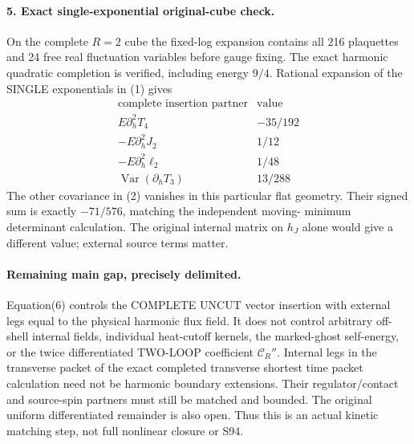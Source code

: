 \documentclass[11pt]{article}
\begin{document}
\paragraph{5. Exact single-exponential original-cube check.}
On the complete $R=2$ cube the fixed-log expansion contains all 216
plaquettes and 24 free real fluctuation variables before gauge fixing.
The exact harmonic quadratic completion is verified, including energy
$9/4$. Rational expansion of the SINGLE exponentials in (1) gives
\[
\begin{array}{c|r}
\text{complete insertion partner}&\text{value}\\\hline
E\partial_h^2T_4&-35/192\\
-E\partial_h^2J_2&1/12\\
-E\partial_h^2\ell_2&1/48\\
\operatorname{Var}(\partial_hT_3)&13/288
\end{array}
\]
The other covariance in (2) vanishes in this particular flat geometry.
Their signed sum is exactly $-71/576$, matching the independent moving-
minimum determinant calculation. The original internal matrix on $h_J$
alone would give a different value; external source terms matter.

\paragraph{Remaining main gap, precisely delimited.}
Equation(6) controls the COMPLETE UNCUT vector insertion with external
legs equal to the physical harmonic flux field. It does not control
arbitrary off-shell internal fields, individual heat-cutoff kernels,
the marked-ghost self-energy, or the twice differentiated TWO-LOOP
coefficient $\mathcal C_R''$. Internal legs in the transverse packet of
the exact completed transverse shortest time packet calculation need not be harmonic boundary extensions. Their regulator/contact
and source-spin partners must still be matched and bounded. The original
uniform differentiated remainder is also open. Thus this is an actual
kinetic matching step, not full nonlinear closure or S94.
\end{document}
